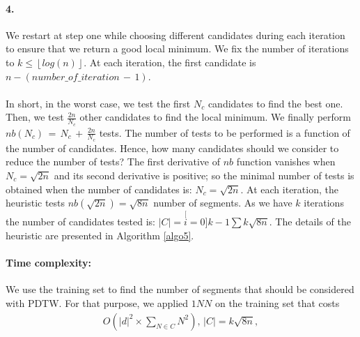 \begin{center}
\end{center}
\paragraph{4.} We restart at step one while choosing
different candidates during each iteration to ensure that we return a good
local minimum. We fix the number of iterations to $k \leq \left\lfloor log(n)\right\rfloor $. At each iteration, the first candidate is $n-(number \_ of \_ iteration \,-\, 1)$.


\paragraph{}In short, in the worst case, we test the first $N_{c}$ candidates to find the best one.
Then, we test $\frac{2n}{N_{c}}$ other candidates to find the local minimum.
We finally perform $nb(N_{c})\, =\, N_{c}\, +\, \frac{2n}{N_{c}}$ tests. The number of tests
 to be performed is a function of the number of candidates. Hence, how many
candidates should we consider to reduce the number of tests? The first
derivative of $nb$ function  vanishes when $N_{c}=\sqrt{2n}$ and its second derivative is
positive; so the minimal number of tests is obtained when the number of candidates is: 
$N_{c}=\sqrt{2n}$. At each
iteration, the heuristic tests $nb(\sqrt{2n})=\sqrt{8n}$ number of segments. As we have $k$
iterations the number of candidates tested is: $|C|=\stackrel[i=0]{k-1}{\sum}{\textstyle
k\sqrt{8n}}$. The details of the heuristic are presented in Algorithm \ref{algo5}.

\paragraph{Time complexity: }
We use the training set to find the number of segments that should be considered
with PDTW. For that purpose, we applied $1NN$ on the training set that costs
\begin{eqnarray}
O(|d|^{2} \times \underset{N\in C}{\sum}{\displaystyle
N^{2}}),\, |C|= k\sqrt{8n},
\end{eqnarray}


